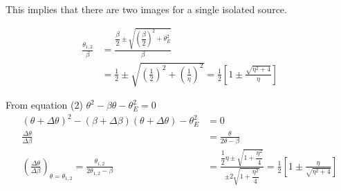 \begin{description}
This implies that there are two images for a single isolated source.

\item[e).]
\begin{align*}
\frac{\theta_{1,2}}{\beta}
  &= \frac{\dfrac{\beta}{2}
       \pm \sqrt{\left(\dfrac{\beta}{2}\right)^2 + \theta_E^2}}{\beta}\\
  &= \frac{1}{2}
     \pm \sqrt{\left(\frac{1}{2}\right)^2 + \left(\frac{1}{\eta}\right)^2}
   = \frac{1}{2}\left[1 \pm \frac{\sqrt{\eta^2 + 4}}{\eta}\right]
  \tag*{(1 point)}
\end{align*}

\item[f).] From equation (2) $\theta^2 - \beta\theta - \theta_E^2 = 0$
\begin{align*}
\left(\theta + \Delta\theta\right)^2
  - \left(\beta + \Delta\beta\right)\left(\theta + \Delta\theta\right)
  - \theta_E^2 &= 0\\
\frac{\Delta\theta}{\Delta\beta}
  &= \frac{\theta}{2\theta - \beta} \tag*{(1 point)}\\
\left(\frac{\Delta\theta}{\Delta\beta}\right)_{\theta=\theta_{1,2}}
  = \frac{\theta_{1,2}}{2\theta_{1,2} - \beta}
  &= \frac{\dfrac{1}{2}\eta \pm \sqrt{1 + \dfrac{\eta^2}{4}}}
          {\pm 2\sqrt{1 + \dfrac{\eta^2}{4}}}
   = \frac{1}{2}\left[1 \pm \frac{\eta}{\sqrt{\eta^2 + 4}}\right]
  \tag*{(1 point)}
\end{align*}
\end{description}
